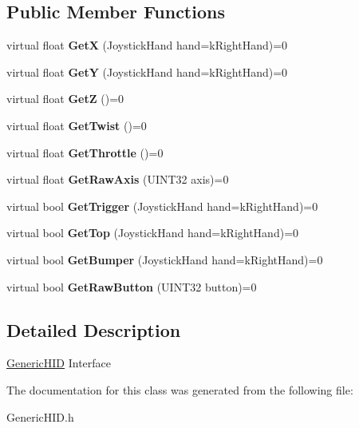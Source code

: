 \subsection*{Public Member Functions}
\begin{DoxyCompactItemize}
\item 
\hypertarget{classGenericHID_aec37ad96a57c42d1673ae98e13950ff8}{
virtual float {\bfseries GetX} (JoystickHand hand=kRightHand)=0}
\label{classGenericHID_aec37ad96a57c42d1673ae98e13950ff8}

\item 
\hypertarget{classGenericHID_ae6f943cc10ca54b67bacff5df38254d5}{
virtual float {\bfseries GetY} (JoystickHand hand=kRightHand)=0}
\label{classGenericHID_ae6f943cc10ca54b67bacff5df38254d5}

\item 
\hypertarget{classGenericHID_aaf7289ae45da867b5b4c5328e66b61c0}{
virtual float {\bfseries GetZ} ()=0}
\label{classGenericHID_aaf7289ae45da867b5b4c5328e66b61c0}

\item 
\hypertarget{classGenericHID_ad0452a1517f47b28b5a6360b343df221}{
virtual float {\bfseries GetTwist} ()=0}
\label{classGenericHID_ad0452a1517f47b28b5a6360b343df221}

\item 
\hypertarget{classGenericHID_aa392c654c01b3379909ee25d0e37565a}{
virtual float {\bfseries GetThrottle} ()=0}
\label{classGenericHID_aa392c654c01b3379909ee25d0e37565a}

\item 
\hypertarget{classGenericHID_aa705937a89375c73dbcdd18e177e9dfa}{
virtual float {\bfseries GetRawAxis} (UINT32 axis)=0}
\label{classGenericHID_aa705937a89375c73dbcdd18e177e9dfa}

\item 
\hypertarget{classGenericHID_adec9a51569114af2f237a316dc394d51}{
virtual bool {\bfseries GetTrigger} (JoystickHand hand=kRightHand)=0}
\label{classGenericHID_adec9a51569114af2f237a316dc394d51}

\item 
\hypertarget{classGenericHID_a5991c05652c8f48f1bc200878d7cce50}{
virtual bool {\bfseries GetTop} (JoystickHand hand=kRightHand)=0}
\label{classGenericHID_a5991c05652c8f48f1bc200878d7cce50}

\item 
\hypertarget{classGenericHID_ae44948c457407b0f156bac3b27bb12ea}{
virtual bool {\bfseries GetBumper} (JoystickHand hand=kRightHand)=0}
\label{classGenericHID_ae44948c457407b0f156bac3b27bb12ea}

\item 
\hypertarget{classGenericHID_a1ae5396e0a5aa0bef70a75d1a823fa3f}{
virtual bool {\bfseries GetRawButton} (UINT32 button)=0}
\label{classGenericHID_a1ae5396e0a5aa0bef70a75d1a823fa3f}

\end{DoxyCompactItemize}


\subsection{Detailed Description}
\hyperlink{classGenericHID}{GenericHID} Interface 

The documentation for this class was generated from the following file:\begin{DoxyCompactItemize}
\item 
GenericHID.h\end{DoxyCompactItemize}
